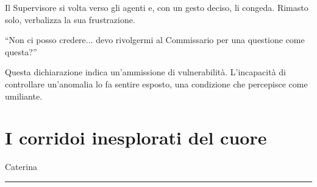 Il Supervisore si volta verso gli agenti e, con un gesto deciso, li congeda. Rimasto solo, verbalizza la sua frustrazione.

\begin{dialogue}
 \enquote{Non ci posso credere... devo rivolgermi al Commissario per una questione come questa?}
\end{dialogue}

Questa dichiarazione indica un'ammissione di vulnerabilità. L'incapacità di controllare un'anomalia lo fa sentire esposto, una condizione che percepisce come umiliante.

\newpage
\section{I corridoi inesplorati del cuore}


\begin{center}
\begin{minipage}{0.7\textwidth}
    \centering
\end{minipage}
\end{center}

\vspace{1em}
\begin{center}Caterina\end{center}
\hrule
\vspace{1em}


